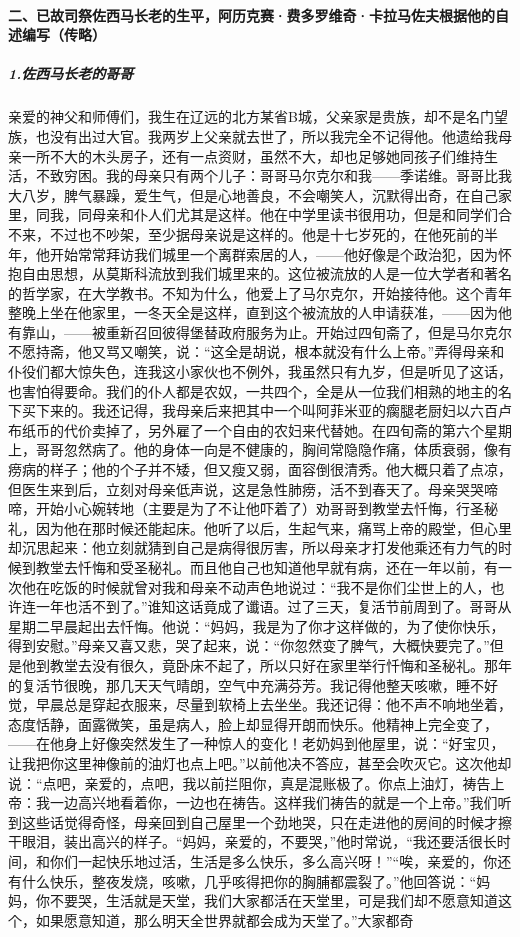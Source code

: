 \paragraph*{二、已故司祭佐西马长老的生平，阿历克赛·费多罗维奇·卡拉马佐夫根据他的自述编写（传略）}
\subparagraph*{1.佐西马长老的哥哥}
\par 亲爱的神父和师傅们，我生在辽远的北方某省B城，父亲家是贵族，却不是名门望族，也没有出过大官。我两岁上父亲就去世了，所以我完全不记得他。他遗给我母亲一所不大的木头房子，还有一点资财，虽然不大，却也足够她同孩子们维持生活，不致穷困。我的母亲只有两个儿子：哥哥马尔克尔和我——季诺维。哥哥比我大八岁，脾气暴躁，爱生气，但是心地善良，不会嘲笑人，沉默得出奇，在自己家里，同我，同母亲和仆人们尤其是这样。他在中学里读书很用功，但是和同学们合不来，不过也不吵架，至少据母亲说是这样的。他是十七岁死的，在他死前的半年，他开始常常拜访我们城里一个离群索居的人，——他好像是个政治犯，因为怀抱自由思想，从莫斯科流放到我们城里来的。这位被流放的人是一位大学者和著名的哲学家，在大学教书。不知为什么，他爱上了马尔克尔，开始接待他。这个青年整晚上坐在他家里，一冬天全是这样，直到这个被流放的人申请获准，——因为他有靠山，——被重新召回彼得堡替政府服务为止。开始过四旬斋了，但是马尔克尔不愿持斋，他又骂又嘲笑，说：“这全是胡说，根本就没有什么上帝。”弄得母亲和仆役们都大惊失色，连我这小家伙也不例外，我虽然只有九岁，但是听见了这话，也害怕得要命。我们的仆人都是农奴，一共四个，全是从一位我们相熟的地主的名下买下来的。我还记得，我母亲后来把其中一个叫阿菲米亚的瘸腿老厨妇以六百卢布纸币的代价卖掉了，另外雇了一个自由的农妇来代替她。在四旬斋的第六个星期上，哥哥忽然病了。他的身体一向是不健康的，胸间常隐隐作痛，体质衰弱，像有痨病的样子；他的个子并不矮，但又瘦又弱，面容倒很清秀。他大概只着了点凉，但医生来到后，立刻对母亲低声说，这是急性肺痨，活不到春天了。母亲哭哭啼啼，开始小心婉转地（主要是为了不让他吓着了）劝哥哥到教堂去忏悔，行圣秘礼，因为他在那时候还能起床。他听了以后，生起气来，痛骂上帝的殿堂，但心里却沉思起来：他立刻就猜到自己是病得很厉害，所以母亲才打发他乘还有力气的时候到教堂去忏悔和受圣秘礼。而且他自己也知道他早就有病，还在一年以前，有一次他在吃饭的时候就曾对我和母亲不动声色地说过：“我不是你们尘世上的人，也许连一年也活不到了。”谁知这话竟成了谶语。过了三天，复活节前周到了。哥哥从星期二早晨起出去忏悔。他说：“妈妈，我是为了你才这样做的，为了使你快乐，得到安慰。”母亲又喜又悲，哭了起来，说：“你忽然变了脾气，大概快要完了。”但是他到教堂去没有很久，竟卧床不起了，所以只好在家里举行忏悔和圣秘礼。那年的复活节很晚，那几天天气晴朗，空气中充满芬芳。我记得他整天咳嗽，睡不好觉，早晨总是穿起衣服来，尽量到软椅上去坐坐。我还记得：他不声不响地坐着，态度恬静，面露微笑，虽是病人，脸上却显得开朗而快乐。他精神上完全变了，——在他身上好像突然发生了一种惊人的变化！老奶妈到他屋里，说：“好宝贝，让我把你这里神像前的油灯也点上吧。”以前他决不答应，甚至会吹灭它。这次他却说：“点吧，亲爱的，点吧，我以前拦阻你，真是混账极了。你点上油灯，祷告上帝：我一边高兴地看着你，一边也在祷告。这样我们祷告的就是一个上帝。”我们听到这些话觉得奇怪，母亲回到自己屋里一个劲地哭，只在走进他的房间的时候才擦干眼泪，装出高兴的样子。“妈妈，亲爱的，不要哭，”他时常说，“我还要活很长时间，和你们一起快乐地过活，生活是多么快乐，多么高兴呀！”“唉，亲爱的，你还有什么快乐，整夜发烧，咳嗽，几乎咳得把你的胸脯都震裂了。”他回答说：“妈妈，你不要哭，生活就是天堂，我们大家都活在天堂里，可是我们却不愿意知道这个，如果愿意知道，那么明天全世界就都会成为天堂了。”大家都奇
